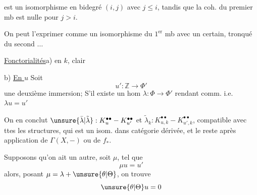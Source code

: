 est un isomorphisme  en bidegré $(i,j)$ avec $j\leq i$,
tandis que la coh. du premier mb est nulle pour $j>i$.

On peut l'exprimer comme un isomorphisme du $1^{\mathrm{er}}$ mb avec un certain,
tronqué du second $\ldots$

\uline{Fonctorialités}\quad a) en $k$, clair

b) \uline{En $u$} Soit
\[
u':\mathbb Z\longrightarrow\Phi'
\]
une deuxième immersion; S'il existe un hom $\lambda:\Phi\longrightarrow\Phi'$
rendant comm.
i.e. $\lambda u=u'$

On en conclut $\unsure{\bar\lambda|\tilde\lambda}:K_u^{\bullet\bullet}-K_{u'}^{\bullet\bullet}$
et $\tilde\lambda_k:K_{u,k}^{\bullet\bullet}-K_{u',k}^{\bullet\bullet}$,
compatible avec ttes les structures, qui est un isom. dans 
catégorie dérivée, et le reste après application de $\Gamma(X,-)$ ou de $f_*$.

Supposons qu'on ait un autre, soit $\mu$, tel que
\[
\mu u=u'
\]
alors, posant $\mu=\lambda+\unsure{\theta|\Theta}$,
on trouve
\[
\unsure{\theta|\Theta}u=0
\]

